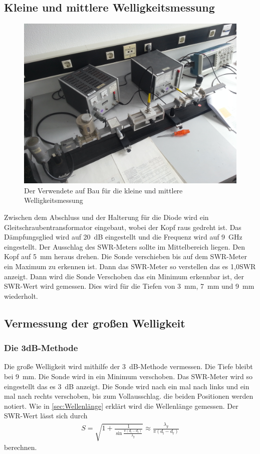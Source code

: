\subsection{Kleine und mittlere Welligkeitsmessung}
\begin{figure}[h!]
	\centering
	\includegraphics[scale =0.1]{../Grafiken/Aufbau_5.jpg}
	\caption{Der Verwendete auf Bau für die kleine und mittlere Welligkeitsmessung\label{fig:AufbauWellig}}
\end{figure}
Zwischen dem Abschluss und der Halterung für die Diode wird ein Gleitschraubentransformator eingebaut, wobei der Kopf raus gedreht ist. Das Dämpfungsglied wird auf \SI{20}{\deci\bel} eingestellt und die Frequenz wird auf \SI{9}{\giga\hertz} eingestellt. Der Ausschlag des SWR-Meters sollte im Mittelbereich liegen. Den Kopf auf \SI{5}{\milli\meter} heraus drehen. Die Sonde verschieben bis auf dem SWR-Meter ein Maximum zu erkennen ist. Dann das SWR-Meter so verstellen das es 1,0SWR anzeigt. Dann wird die Sonde Verschoben das ein Minimum erkennbar ist, der SWR-Wert wird gemessen. Dies wird für die Tiefen von \SI{3}{\milli\meter}, \SI{7}{\milli\meter} und \SI{9}{\milli\meter} wiederholt.
\subsection{Vermessung der großen Welligkeit}
\subsubsection{Die 3dB-Methode}
Die große Welligkeit wird mithilfe der \SI{3}{\deci\bel}-Methode vermessen. Die Tiefe bleibt bei \SI{9}{\milli\meter}. Die Sonde wird in ein Minimum verschoben. Das SWR-Meter wird so eingestellt das es \SI{3}{\deci\bel} anzeigt. Die Sonde wird nach ein mal nach links und ein mal nach rechts verschoben, bis zum Vollausschlag. die beiden Positionen werden notiert. Wie in \cref{sec:Wellenlänge} erklärt wird die Wellenlänge gemessen. Der SWR-Wert lässt sich durch 
\begin{align}
	S=\sqrt{1+\frac{1}{\sin\frac{\pi ( d_\text{l} - d_\text{r} ) }{ \lambda_g }}} \approx \frac{ \lambda_g }{\pi(d_\text{l} - d_\text{r})}
\end{align}
berechnen.
